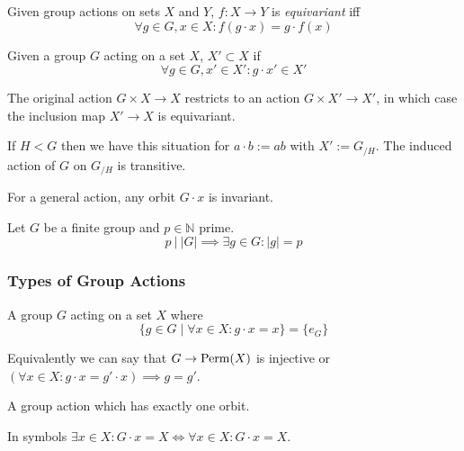 \begin{definition}
   Given group actions on sets \(X\) and \(Y\), \(f: X \to Y\) is \emph{equivariant} iff
   \[\forall g \in G, x \in X: f(g \cdot x) = g \cdot f(x)\]
\end{definition}

\begin{definition}
   Given a group \(G\) acting on a set \(X\), \(X' \subset X\) if
   \[\forall g \in G, x' \in X': g \cdot x' \in X'\]
\end{definition}
\begin{remark}
   The original action \(G \times X \to X\) restricts to an action \(G \times X' \to X'\), in which case the inclusion map \(X' \to X\) is equivariant.
\end{remark}
\begin{example}
   If \(H < G\) then we have this situation for \(a \cdot b := ab\) with \(X' := G_{/H}\).
   The induced action of \(G\) on \(G_{/H}\) is transitive.

   For a general action, any orbit \(G \cdot x\) is invariant.
\end{example}

\begin{proposition}
   Let \(G\) be a finite group and \(p \in \mathbb{N}\) prime.
   \[p~|~|G| \implies \exists g \in G: |g| = p\]
\end{proposition}

\subsubsection{Types of Group Actions}
\begin{definition}
   A group \(G\) acting on a set \(X\) where
   \[\{g \in G \mid \forall x \in X: g \cdot x = x\} = \{e_G\}\]
\end{definition}
\begin{remark}
   Equivalently we can say that \(G \to \operatorname{Perm}(X)\) is injective or \((\forall x \in X: g \cdot x = g' \cdot x) \implies g = g'\).
\end{remark}

\begin{definition}
   A group action which has exactly one orbit.
\end{definition}
\begin{remark}
   In symbols \(\exists x \in X: G \cdot x = X \iff \forall x \in X: G \cdot x = X\).
\end{remark}


